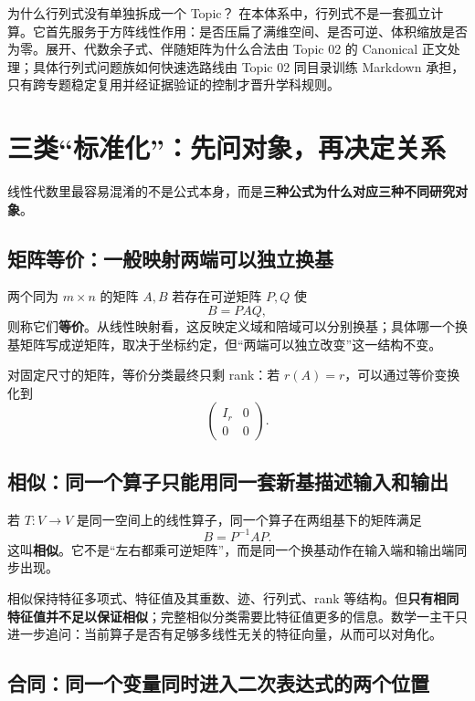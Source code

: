 \documentclass[11pt,a4paper]{ctexart}
\newcommand{\kw}[1]{\textbf{\color{deep}#1}}
\begin{document}
\begin{warnbox}{为什么行列式没有单独拆成一个 Topic？}
在本体系中，行列式不是一套孤立计算。它首先服务于方阵线性作用：是否压扁了满维空间、是否可逆、体积缩放是否为零。展开、代数余子式、伴随矩阵为什么合法由 Topic 02 的 Canonical 正文处理；具体行列式问题族如何快速选路线由 Topic 02 同目录训练 Markdown 承担，只有跨专题稳定复用并经证据验证的控制才晋升学科规则。
\end{warnbox}

\section{三类“标准化”：先问对象，再决定关系}

线性代数里最容易混淆的不是公式本身，而是\kw{三种公式为什么对应三种不同研究对象}。

\subsection{矩阵等价：一般映射两端可以独立换基}

两个同为 $m\times n$ 的矩阵 $A,B$ 若存在可逆矩阵 $P,Q$ 使
\[
\boxed{B=PAQ},
\]
则称它们\kw{等价}。从线性映射看，这反映定义域和陪域可以分别换基；具体哪一个换基矩阵写成逆矩阵，取决于坐标约定，但“两端可以独立改变”这一结构不变。

对固定尺寸的矩阵，等价分类最终只剩 rank：若 $r(A)=r$，可以通过等价变换化到
\[
\begin{pmatrix}
I_r&0\\0&0
\end{pmatrix}.
\]

\subsection{相似：同一个算子只能用同一套新基描述输入和输出}

若 $T:V\to V$ 是同一空间上的线性算子，同一个算子在两组基下的矩阵满足
\[
\boxed{B=P^{-1}AP}.
\]
这叫\kw{相似}。它不是“左右都乘可逆矩阵”，而是同一个换基动作在输入端和输出端同步出现。

相似保持特征多项式、特征值及其重数、迹、行列式、rank 等结构。但\kw{只有相同特征值并不足以保证相似}；完整相似分类需要比特征值更多的信息。数学一主干只进一步追问：当前算子是否有足够多线性无关的特征向量，从而可以对角化。

\subsection{合同：同一个变量同时进入二次表达式的两个位置}
\end{document}
